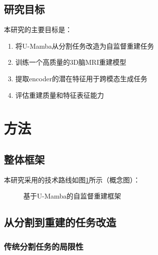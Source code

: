 \documentclass[11pt,a4paper]{article}
\begin{document}
\subsection{研究目标}

本研究的主要目标是：
\begin{enumerate}
    \item 将U-Mamba从分割任务改造为自监督重建任务
    \item 训练一个高质量的3D脑MRI重建模型
    \item 提取encoder的潜在特征用于跨模态生成任务
    \item 评估重建质量和特征表征能力
\end{enumerate}

\section{方法}

\subsection{整体框架}

本研究采用的技术路线如图\ref{fig:framework}所示（概念图）：

\begin{figure}[htbp]
    \centering
    \caption{基于U-Mamba的自监督重建框架}
    \label{fig:framework}
\end{figure}

\subsection{从分割到重建的任务改造}

\subsubsection{传统分割任务的局限性}
\end{document}

